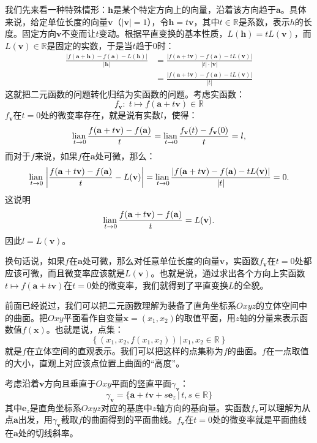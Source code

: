 \documentclass[12pt,UTF8,fontset=none]{ctexbook}
\begin{document}
我们先来看一种特殊情形：$\mathbf{h}$是某个特定方向上的向量，沿着该方向趋于$\mathbf{a}$。具体来说，给定单位长度的向量$\mathbf{v}$（$|\mathbf{v}| = 1$），令$\mathbf{h} = t\mathbf{v}$，其中$t\in\mathbb{R}$是系数，表示$h$的长度。固定方向$\mathbf{v}$不变而让$t$变动。根据平直变换的基本性质，$L(\mathbf{h}) = tL(\mathbf{v})$，而$L(\mathbf{v})\in\mathbb{R}$是固定的实数，于是当$t$趋于$0$时：
\begin{align*}
    \frac{\left|f(\mathbf{a} + \mathbf{h}) - f(\mathbf{a}) - L(\mathbf{h})\right|}{|\mathbf{h}|} &= \frac{\left|f(\mathbf{a} + t\mathbf{v}) - f(\mathbf{a}) - tL(\mathbf{v})\right|}{|t|\cdot|\mathbf{v}|} \\ 
    &= \frac{\left|f(\mathbf{a} + t\mathbf{v}) - f(\mathbf{a}) - tL(\mathbf{v})\right|}{|t|}
\end{align*}
这就把二元函数的问题转化归结为实函数的问题。考虑实函数：
$$ f_{\mathbf{v}} : \;t\mapsto f(\mathbf{a} + t\mathbf{v}) \in \mathbb{R}$$
$ f_{\mathbf{v}}$在$t=0$处的微变率存在，就是说有实数$l$，使得：
$$ \underset{t\to 0}{\operatorname{lian}\,} \frac{f(\mathbf{a} + t\mathbf{v}) - f(\mathbf{a})}{t} = \underset{t\to 0}{\operatorname{lian}\,} \frac{f_{\mathbf{v}}(t) - f_{\mathbf{v}}(0)}{t} = l, $$
而对于$f$来说，如果$f$在$\mathbf{a}$处可微，那么：
$$ \underset{t\to 0}{\operatorname{lian}\,} \left|\frac{f(\mathbf{a} + t\mathbf{v}) - f(\mathbf{a})}{t} - L(\mathbf{v}) \right|= \underset{t\to 0}{\operatorname{lian}\,} \frac{\left|f(\mathbf{a} + t\mathbf{v}) - f(\mathbf{a}) - tL(\mathbf{v})\right|}{|t|} = 0.$$
这说明
$$ \underset{t\to 0}{\operatorname{lian}\,} \frac{f(\mathbf{a} + t\mathbf{v}) - f(\mathbf{a})}{t} = L(\mathbf{v}).$$
因此$l = L(\mathbf{v})$。

换句话说，如果$f$在$\mathbf{a}$处可微，那么对任意单位长度的向量$\mathbf{v}$，实函数$ f_{\mathbf{v}}$在$t=0$处都应该可微，而且微变率应该就是$L(\mathbf{v})$。也就是说，通过求出各个方向上实函数$ t\mapsto f(\mathbf{a} + t\mathbf{v})$在$t=0$处的微变率，我们就得到了平直变换$L$的全貌。

前面已经说过，我们可以把二元函数理解为装备了直角坐标系$Oxyz$的立体空间中的曲面。把$Oxy$平面看作自变量$\mathbf{x} = (x_1, x_2)$的取值平面，用$z$轴的分量来表示函数值$f(\mathbf{x})$。也就是说，点集：
$$\left\{(x_1, x_2, f(x_1, x_2)) \, \big| \, x_1, x_2 \in \mathbb{R} \right\}$$
就是$f$在立体空间的直观表示。我们可以把这样的点集称为$f$的曲面。$f$在一点取值的大小，直观上对应该点位置上曲面的“高度”。

考虑沿着$\mathbf{v}$方向且垂直于$Oxy$平面的竖直平面$\gamma_{\mathbf{v}}$：
$$\gamma_{\mathbf{v}} = \{\mathbf{a} + t\mathbf{v} + s\mathbf{e}_z \, | \, t, s \in \mathbb{R}\}$$
其中$\mathbf{e}_z$是直角坐标系$Oxyz$对应的基底中$z$轴方向的基向量。实函数$f_{\mathbf{v}}$可以理解为从点$\mathbf{a}$出发，用$\gamma_{\mathbf{v}}$截取$f$的曲面得到的平面曲线。$ f_{\mathbf{v}}$在$t=0$处的微变率就是平面曲线在$\mathbf{a}$处的切线斜率。
\end{document}
